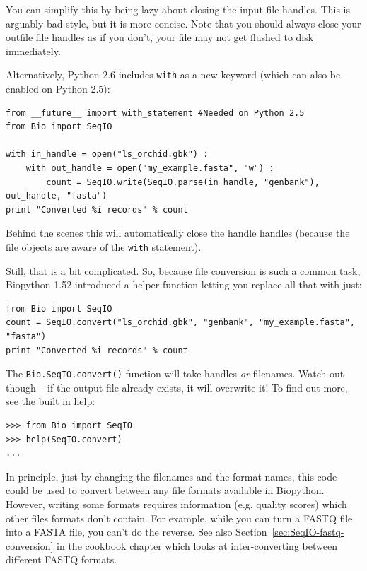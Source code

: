 \documentclass{report}
\begin{document}
You can simplify this by being lazy about closing the input file handles. This
is arguably bad style, but it is more concise. Note that you should always
close your outfile file handles as if you don't, your file may not get flushed
to disk immediately.

Alternatively, Python 2.6 includes \verb|with| as a new keyword (which can
also be enabled on Python 2.5):

\begin{verbatim}
from __future__ import with_statement #Needed on Python 2.5
from Bio import SeqIO

with in_handle = open("ls_orchid.gbk") :
    with out_handle = open("my_example.fasta", "w") :
        count = SeqIO.write(SeqIO.parse(in_handle, "genbank"), out_handle, "fasta")
print "Converted %i records" % count
\end{verbatim}

\noindent Behind the scenes this will automatically close the handle handles
(because the file objects are aware of the \verb|with| statement).

Still, that is a bit complicated. So, because file conversion is such a
common task, Biopython 1.52 introduced a helper function letting you replace
all that with just:

\begin{verbatim}
from Bio import SeqIO
count = SeqIO.convert("ls_orchid.gbk", "genbank", "my_example.fasta", "fasta")
print "Converted %i records" % count
\end{verbatim}

The \verb|Bio.SeqIO.convert()| function will take handles \emph{or} filenames.
Watch out though -- if the output file already exists, it will overwrite it!
To find out more, see the built in help:

\begin{verbatim}
>>> from Bio import SeqIO
>>> help(SeqIO.convert)
...
\end{verbatim}

In principle, just by changing the filenames and the format names, this code
could be used to convert between any file formats available in Biopython.
However, writing some formats requires information (e.g. quality scores) which
other files formats don't contain. For example, while you can turn a FASTQ
file into a FASTA file, you can't do the reverse. See also
Section~\ref{sec:SeqIO-fastq-conversion} in the cookbook chapter which looks
at inter-converting between different FASTQ formats.
\end{document}
